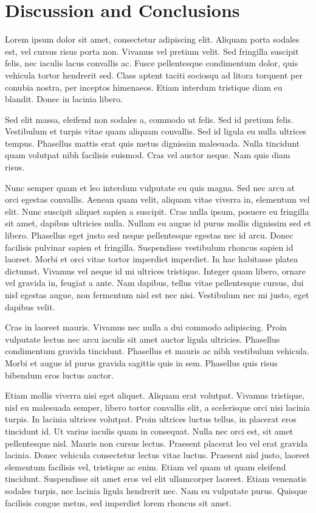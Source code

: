 \documentclass[a4paper,fleqn,usenatbib]{mnras}
\begin{document}
\section{Discussion and Conclusions}
Lorem ipsum dolor sit amet, consectetur adipiscing elit. Aliquam porta
sodales est, vel cursus risus porta non. Vivamus vel pretium
velit. Sed fringilla suscipit felis, nec iaculis lacus convallis
ac. Fusce pellentesque condimentum dolor, quis vehicula tortor
hendrerit sed. Class aptent taciti sociosqu ad litora torquent per
conubia nostra, per inceptos himenaeos. Etiam interdum tristique diam
eu blandit. Donec in lacinia libero.

Sed elit massa, eleifend non sodales a, commodo ut felis. Sed id
pretium felis. Vestibulum et turpis vitae quam aliquam convallis. Sed
id ligula eu nulla ultrices tempus. Phasellus mattis erat quis metus
dignissim malesuada. Nulla tincidunt quam volutpat nibh facilisis
euismod. Cras vel auctor neque. Nam quis diam risus.

Nunc semper quam et leo interdum vulputate eu quis magna. Sed nec arcu
at orci egestas convallis. Aenean quam velit, aliquam vitae viverra
in, elementum vel elit. Nunc suscipit aliquet sapien a suscipit. Cras
nulla ipsum, posuere eu fringilla sit amet, dapibus ultricies
nulla. Nullam eu augue id purus mollis dignissim sed et
libero. Phasellus eget justo sed neque pellentesque egestas nec id
arcu. Donec facilisis pulvinar sapien et fringilla. Suspendisse
vestibulum rhoncus sapien id laoreet. Morbi et orci vitae tortor
imperdiet imperdiet. In hac habitasse platea dictumst. Vivamus vel
neque id mi ultrices tristique. Integer quam libero, ornare vel
gravida in, feugiat a ante. Nam dapibus, tellus vitae pellentesque
cursus, dui nisl egestas augue, non fermentum nisl est nec
nisi. Vestibulum nec mi justo, eget dapibus velit.

Cras in laoreet mauris. Vivamus nec nulla a dui commodo
adipiscing. Proin vulputate lectus nec arcu iaculis sit amet auctor
ligula ultricies. Phasellus condimentum gravida tincidunt. Phasellus
et mauris ac nibh vestibulum vehicula. Morbi et augue id purus gravida
sagittis quis in sem. Phasellus quis risus bibendum eros luctus
auctor.

Etiam mollis viverra nisi eget aliquet. Aliquam erat volutpat. Vivamus
tristique, nisl eu malesuada semper, libero tortor convallis elit, a
scelerisque orci nisi lacinia turpis. In lacinia ultrices
volutpat. Proin ultrices luctus tellus, in placerat eros tincidunt
id. Ut varius iaculis quam in consequat. Nulla nec orci est, sit amet
pellentesque nisl. Mauris non cursus lectus. Praesent placerat leo vel
erat gravida lacinia. Donec vehicula consectetur lectus vitae
luctus. Praesent nisl justo, laoreet elementum facilisis vel,
tristique ac enim. Etiam vel quam ut quam eleifend
tincidunt. Suspendisse sit amet eros vel elit ullamcorper
laoreet. Etiam venenatis sodales turpis, nec lacinia ligula hendrerit
nec. Nam eu vulputate purus. Quisque facilisis congue metus, sed
imperdiet lorem rhoncus sit amet.
\end{document}
